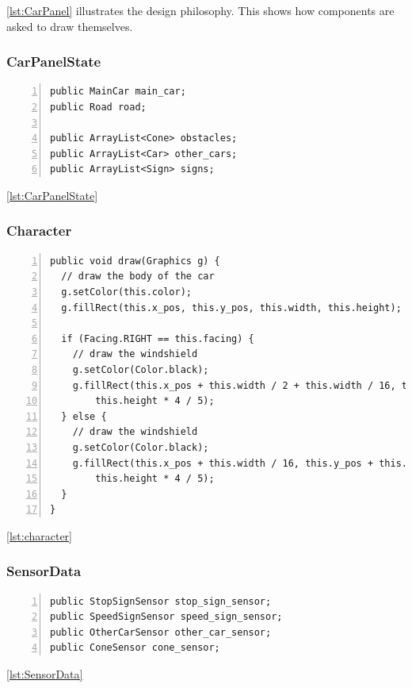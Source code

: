 \documentclass{article} %
\begin{document}
\ref{lst:CarPanel} illustrates the design philosophy. 
This shows how components are asked to draw themselves.

\subsubsection{CarPanelState}
\begin{lstlisting}[caption={Car Panel State maintains all objects drawn on the screen},label={lst:CarPanelState},numbers=left]
public MainCar main_car;
public Road road;

public ArrayList<Cone> obstacles;
public ArrayList<Car> other_cars;
public ArrayList<Sign> signs;
\end{lstlisting}

\ref{lst:CarPanelState}

\subsubsection{Character}
\begin{lstlisting}[caption={Sample Implementation of a Character},label={lst:character},numbers=left]
public void draw(Graphics g) {
  // draw the body of the car
  g.setColor(this.color);
  g.fillRect(this.x_pos, this.y_pos, this.width, this.height);

  if (Facing.RIGHT == this.facing) {
    // draw the windshield
    g.setColor(Color.black);
    g.fillRect(this.x_pos + this.width / 2 + this.width / 16, this.y_pos + this.height / 10, this.width / 3,
        this.height * 4 / 5);
  } else {
    // draw the windshield
    g.setColor(Color.black);
    g.fillRect(this.x_pos + this.width / 16, this.y_pos + this.height / 10, this.width / 3,
        this.height * 4 / 5);
  }
}
\end{lstlisting}

\ref{lst:character}

\subsubsection{SensorData}
\begin{lstlisting}[caption={Sensor Data maintains a number of sensors},label={lst:SensorData},numbers=left]
public StopSignSensor stop_sign_sensor;
public SpeedSignSensor speed_sign_sensor;
public OtherCarSensor other_car_sensor;
public ConeSensor cone_sensor;
\end{lstlisting}

\ref{lst:SensorData}
\end{document}
